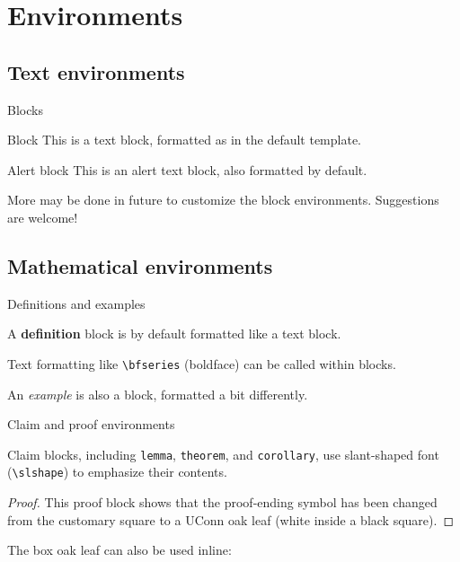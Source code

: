 \documentclass{beamer}
\begin{document}
\section{Environments}


\subsection{Text environments}


\begin{frame}{Blocks}

\begin{block}{Block}
This is a text block, formatted as in the {\ttfamily default} template.
\end{block}

\begin{alertblock}{Alert block}
This is an alert text block, also formatted by default.
\end{alertblock}

More may be done in future to customize the block environments. Suggestions are welcome!

\end{frame}


\subsection{Mathematical environments}


\begin{frame}[fragile]{Definitions and examples}

\begin{definition}
A {\bfseries definition} block is by default formatted like a text block.
\end{definition}

Text formatting like \verb|\bfseries| (boldface) can be called within blocks.

\begin{example}
An \emph{example} is also a block, formatted a bit differently.
\end{example}

\end{frame}


\begin{frame}[fragile]{Claim and proof environments}

\begin{theorem}
Claim blocks, including \verb|lemma|, \verb|theorem|, and \verb|corollary|, use slant-shaped font (\verb|\slshape|) to emphasize their contents.
\end{theorem}

\begin{proof}
This proof block shows that the proof-ending symbol has been changed from the customary square to a UConn oak leaf (white inside a black square).
\end{proof}

\begin{corollary}
The box oak leaf can also be used inline: \oakleafbox
\end{corollary}

\end{frame}
\end{document}
